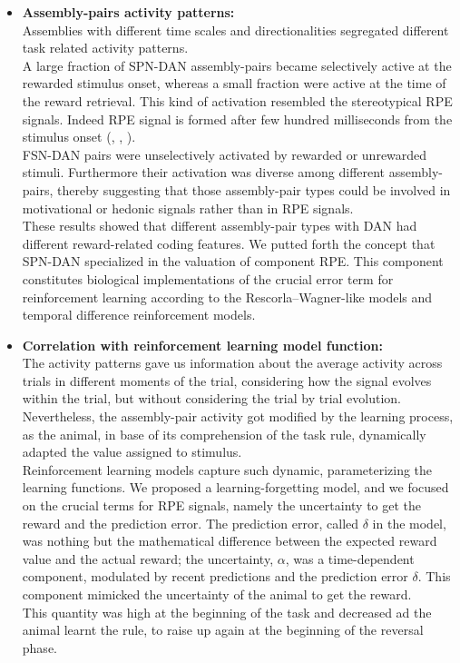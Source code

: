 \begin{itemize}
    \item \textbf{Assembly-pairs activity patterns:}\\
    Assemblies with different time scales and directionalities segregated different task related activity patterns.\\A large fraction of SPN-DAN assembly-pairs became selectively active at the rewarded stimulus onset, whereas a small fraction were active at the time of the reward retrieval. This kind of activation resembled the stereotypical RPE signals. Indeed RPE signal is formed after few hundred milliseconds from the stimulus onset (\cite{Tobler2003}, \cite{Nomoto2010}, \cite{Schultz2016}).\\FSN-DAN pairs were unselectively activated by rewarded or unrewarded stimuli. Furthermore their activation was diverse among different assembly-pairs, thereby suggesting that those assembly-pair types could be involved in motivational or hedonic signals rather than in RPE signals.\\These results showed that different assembly-pair types with DAN had different reward-related coding features. We putted forth the concept that SPN-DAN specialized in the valuation of component RPE. This component constitutes biological implementations of the crucial error term for reinforcement learning according to the Rescorla–Wagner-like models and temporal difference reinforcement models. 
    \item \textbf{Correlation with reinforcement learning model function:}\\The activity patterns gave us information about the average activity across trials in different moments of the trial, considering how the signal evolves within the trial, but without considering the trial by trial evolution. Nevertheless, the assembly-pair activity got modified by the learning process, as the animal, in base of its comprehension of the task rule, dynamically adapted the value assigned to stimulus.\\Reinforcement learning models capture such dynamic, parameterizing the learning functions. We proposed a learning-forgetting model, and we focused on the crucial terms for RPE signals, namely the uncertainty to get the reward and the prediction error. The prediction error, called $\delta$ in the model, was nothing but the mathematical difference between the expected reward value and the actual reward; the uncertainty, $\alpha$, was a time-dependent component, modulated by recent predictions and the prediction error $\delta$. This component mimicked the uncertainty of the animal to get the reward.\\This quantity was high at the beginning of the task and decreased ad the animal learnt the rule, to raise up again at the beginning of the reversal phase.%

\end{itemize}
